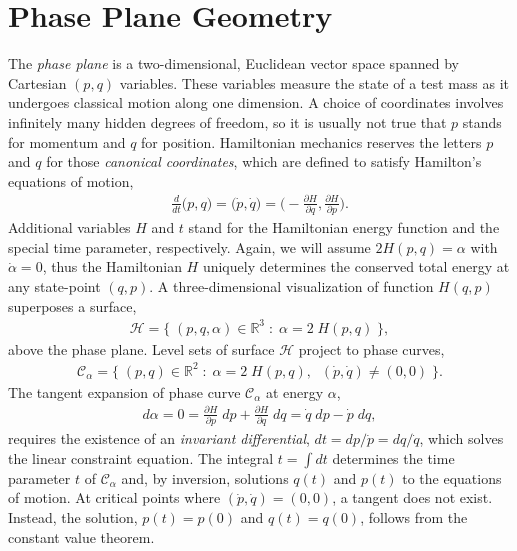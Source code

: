 \documentclass[nofootinbib,preprint]{revtex4-1}
\begin{document}



\section{Phase Plane Geometry}

The \textit{phase plane} is a two-dimensional, Euclidean vector space spanned by 
Cartesian $(p,q)$ variables. These variables measure the state of a test mass as it 
undergoes classical motion along one dimension. A choice of coordinates involves infinitely
many hidden degrees of freedom, so it is usually not true that $p$ stands for momentum and 
$q$ for position. Hamiltonian mechanics reserves the letters $p$ and $q$ for those 
\textit{canonical coordinates}, which are defined to satisfy Hamilton's equations of motion,
\begin{eqnarray}
\frac{d}{dt}\Big(p,q\Big)= \Big(\dot{p},\dot{q}\Big) 
= \bigg(-\frac{\partial H }{\partial q}, \frac{\partial H}{\partial p} \bigg). \nonumber
\end{eqnarray}
Additional variables $H$ and $t$ stand for the Hamiltonian energy function and the special
time parameter, respectively. Again, we will assume $2H(p,q)=\alpha$ 
with $\dot{\alpha} = 0$, thus the Hamiltonian $H$ uniquely determines the conserved total 
energy at any state-point $(q,p)$. A three-dimensional visualization of function $H(q,p)$ 
superposes a surface,
\begin{eqnarray}
\mathcal{H} = \{ \; (p,q,\alpha) \in \mathbb{R}^3 \; : \; \alpha = 2\;H(p,q) \; \}, \nonumber
\end{eqnarray}
above the phase plane. Level sets of surface $\mathcal{H}$ project to phase 
curves,
\begin{eqnarray}
\mathcal{C}_{\alpha} = \{ \; (p,q) \in \mathbb{R}^2 \; : \; \alpha = 2\;H(p,q), \;\; (\dot{p},\dot{q})\neq(0,0) \; \}. \nonumber
\end{eqnarray}
The tangent expansion of phase curve $\mathcal{C}_{\alpha}$ at energy $\alpha$, 
\begin{eqnarray}
d\alpha = 0 = \frac{\partial H}{\partial p}\;dp+\frac{\partial H}{\partial q}\;dq = \dot{q}\;dp-\dot{p}\;dq, \nonumber
\end{eqnarray}
requires the existence of an \textit{invariant differential}, $dt = dp/\dot{p} = dq/\dot{q}$,
which solves the linear constraint equation. The integral $t=\int dt$ determines the time parameter 
$t$ of $\mathcal{C}_{\alpha}$ and, by inversion, solutions $q(t)$ and $p(t)$ to the equations of motion. 
At critical points where $(\dot{p},\dot{q})=(0,0)$, a tangent does not exist. Instead, the solution,  
$p(t)=p(0)$ and $q(t)=q(0)$, follows from the constant value theorem. 
\end{document}
